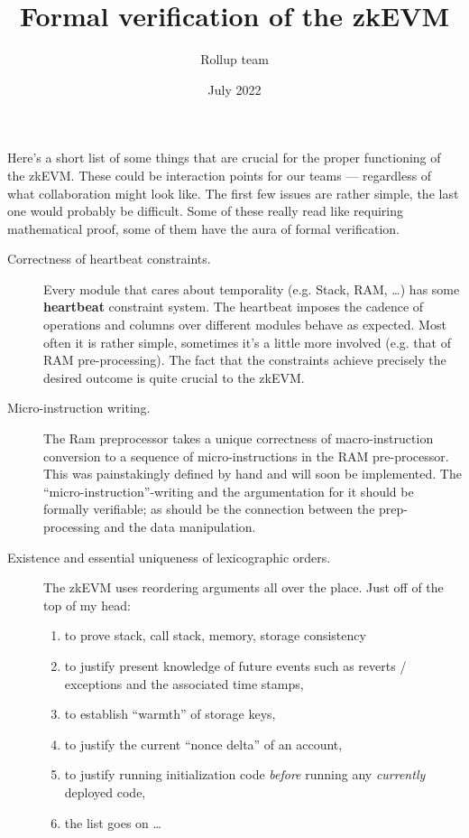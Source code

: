 \documentclass{article}
\title{Formal verification of the zkEVM}
\author{Rollup team}
\date{July 2022}
\begin{document}
\maketitle
\tableofcontents

Here's a short list of some things that are crucial for the proper functioning of the zkEVM. These could be interaction points for our teams --- regardless of what collaboration might look like. The first few issues are rather simple, the last one would probably be difficult. Some of these really read like requiring mathematical proof, some of them have the aura of formal verification.
\begin{description}
	\item[Correctness of heartbeat constraints.] Every module that cares about temporality (e.g. Stack, RAM, \dots{}) has some \textbf{heartbeat} constraint system. The heartbeat imposes the cadence of operations and columns over different modules behave as expected. Most often it is rather simple, sometimes it's a little more involved (e.g. that of RAM pre-processing). The fact that the constraints achieve precisely the desired outcome is quite crucial to the zkEVM.
	\item[Micro-instruction writing.] The Ram preprocessor takes a unique correctness of macro-instruction conversion to a sequence of micro-instructions in the RAM pre-processor. This was painstakingly defined by hand and will soon be implemented. The ``micro-instruction''-writing and the argumentation for it should be formally verifiable; as should be the connection between the prep-processing and the data manipulation. 
	\item[Existence and essential uniqueness of lexicographic orders.] The zkEVM uses reordering arguments all over the place. Just off of the top of my head:
	\begin{enumerate}
		\item to prove stack, call stack, memory, storage consistency
		\item to justify present knowledge of future events such as reverts / exceptions and the associated time stamps,
		\item to establish ``warmth'' of storage keys,
		\item to justify the current ``nonce delta'' of an account,
		\item to justify running initialization code \emph{before} running any \emph{currently} deployed code,
		\item the list goes on \dots{}
	\end{enumerate}

\end{description}
\end{document}
